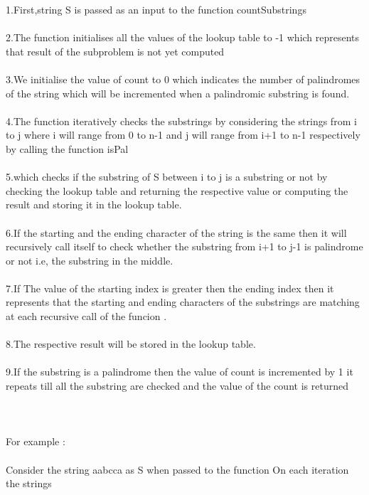 \documentclass[twocolumn]{article}
\begin{document}
\noindent
1.First,string S is passed as an input to the function countSubstrings\\
\noindent\\
2.The function initialises all the values of the lookup table to -1 which represents that result of the subproblem is not yet computed\\
\noindent\\
3.We initialise the value of count to 0 which indicates the number of palindromes of the string which will be incremented when a palindromic substring is found.\\
\noindent\\
4.The function iteratively checks the substrings by considering the strings from i to j where i will range from 0 to n-1 and  j will range from i+1 to n-1 
respectively  by calling the function isPal \\
\noindent\\
5.which checks if the substring of S between i to j is a substring or not by checking the lookup table and 
returning the respective value or computing the result and storing it in the lookup table.\\
\noindent\\
6.If the starting and the ending character of the string is the same then it will recursively call itself to check whether the substring from i+1 to j-1 is palindrome or not i.e, the substring in the middle.\\
\noindent\\
7.If The value of the starting index is greater then the ending index then it represents that the starting and ending characters of the substrings are matching at each recursive call of the funcion .\\
\noindent\\
8.The respective result will be stored in the lookup table.\\
\noindent\\
9.If the substring is a palindrome then the value of count is incremented by 1 it repeats till all the substring are checked and the value of the count is returned\\
\noindent\\
\\
\\
For example :\\
\noindent\\
Consider the string aabcca as S when passed to the function 
On each iteration the  strings\\
\\
\end{document}
